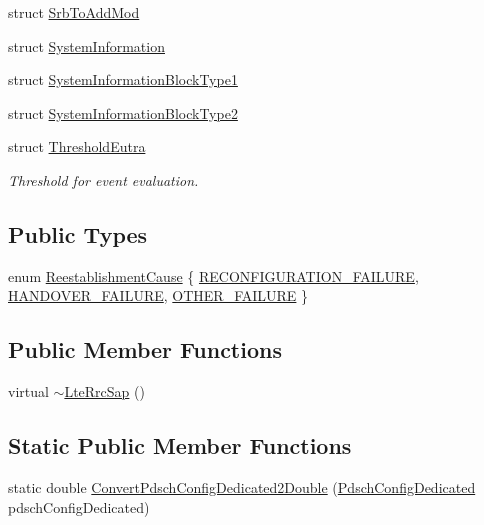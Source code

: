 \begin{DoxyCompactItemize}
\item 
struct \hyperlink{structns3_1_1LteRrcSap_1_1SrbToAddMod}{Srb\+To\+Add\+Mod}
\item 
struct \hyperlink{structns3_1_1LteRrcSap_1_1SystemInformation}{System\+Information}
\item 
struct \hyperlink{structns3_1_1LteRrcSap_1_1SystemInformationBlockType1}{System\+Information\+Block\+Type1}
\item 
struct \hyperlink{structns3_1_1LteRrcSap_1_1SystemInformationBlockType2}{System\+Information\+Block\+Type2}
\item 
struct \hyperlink{structns3_1_1LteRrcSap_1_1ThresholdEutra}{Threshold\+Eutra}
\begin{DoxyCompactList}\small\item\em Threshold for event evaluation. \end{DoxyCompactList}\end{DoxyCompactItemize}
\subsection*{Public Types}
\begin{DoxyCompactItemize}
\item 
enum \hyperlink{classns3_1_1LteRrcSap_ae749c5fa44cab5b732095b42f4845659}{Reestablishment\+Cause} \{ \hyperlink{classns3_1_1LteRrcSap_ae749c5fa44cab5b732095b42f4845659a7e68f0d2424d23331a5977b93d16d35c}{R\+E\+C\+O\+N\+F\+I\+G\+U\+R\+A\+T\+I\+O\+N\+\_\+\+F\+A\+I\+L\+U\+RE}, 
\hyperlink{classns3_1_1LteRrcSap_ae749c5fa44cab5b732095b42f4845659ae9c245f6dd8ac20452aebb1ac058fe62}{H\+A\+N\+D\+O\+V\+E\+R\+\_\+\+F\+A\+I\+L\+U\+RE}, 
\hyperlink{classns3_1_1LteRrcSap_ae749c5fa44cab5b732095b42f4845659a52adabb79ff33ce665f3638884aa6210}{O\+T\+H\+E\+R\+\_\+\+F\+A\+I\+L\+U\+RE}
 \}
\end{DoxyCompactItemize}
\subsection*{Public Member Functions}
\begin{DoxyCompactItemize}
\item 
virtual \hyperlink{classns3_1_1LteRrcSap_a440e28ec70a50d1acba6a323bee8bc2f}{$\sim$\+Lte\+Rrc\+Sap} ()
\end{DoxyCompactItemize}
\subsection*{Static Public Member Functions}
\begin{DoxyCompactItemize}
\item 
static double \hyperlink{classns3_1_1LteRrcSap_add6ee85098c06eeb3267175c4628a03a}{Convert\+Pdsch\+Config\+Dedicated2\+Double} (\hyperlink{structns3_1_1LteRrcSap_1_1PdschConfigDedicated}{Pdsch\+Config\+Dedicated} pdsch\+Config\+Dedicated)
\end{DoxyCompactItemize}
